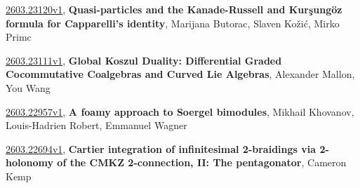 \documentclass[9pt, a4paper]{article}
\theoremstyle{plain}
\theoremstyle{definition}
\theoremstyle{remark}
\newcommand{\arxiv}[3]{\href{https://arxiv.org/abs/#1}{#1}, \textbf{\textcolor{arxivblue}{#2}}, #3}
\begin{document}
\arxiv{2603.23120v1}{Quasi-particles and the Kanade-Russell and Kurşungöz formula for Capparelli's identity}{Marijana Butorac, Slaven Kožić, Mirko Primc}

\arxiv{2603.23111v1}{Global Koszul Duality: Differential Graded Cocommutative Coalgebras and Curved Lie Algebras}{Alexander Mallon, You Wang}

\arxiv{2603.22957v1}{A foamy approach to Soergel bimodules}{Mikhail Khovanov, Louis-Hadrien Robert, Emmanuel Wagner}

\arxiv{2603.22694v1}{Cartier integration of infinitesimal 2-braidings via 2-holonomy of the CMKZ 2-connection, II: The pentagonator}{Cameron Kemp}

\end{document}
